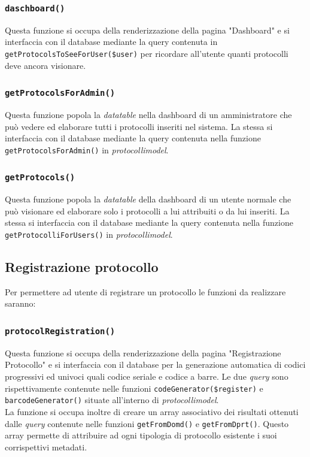     \subsubsection{\texttt{daschboard()}}
    Questa funzione si occupa della renderizzazione della pagina "Dashboard" e si interfaccia con il database mediante la query contenuta in \texttt{getProtocolsToSeeForUser(\$user)} per ricordare all'utente quanti protocolli deve ancora visionare.
    
    \subsubsection{\texttt{getProtocolsForAdmin()}}
    Questa funzione popola la \textit{datatable} nella dashboard di un amministratore che può vedere ed elaborare tutti i protocolli inseriti nel sistema. La stessa si interfaccia con il database mediante la query contenuta nella funzione \texttt{getProtocolsForAdmin()} in \textit{protocollimodel}.
    
    \subsubsection{\texttt{getProtocols()}}
    Questa funzione popola la \textit{datatable} della dashboard di un utente normale che può visionare ed elaborare solo i protocolli a lui attribuiti o da lui inseriti. La stessa si interfaccia con il database mediante la query contenuta nella funzione \texttt{getProtocolliForUsers()} in \textit{protocollimodel}.
    
    \subsection{Registrazione protocollo}
    Per permettere ad utente di registrare un protocollo le funzioni da realizzare saranno:
    
    \subsubsection{\texttt{protocolRegistration()}}
    Questa funzione si occupa della renderizzazione della pagina "Registrazione Protocollo" e si interfaccia con il database per la generazione automatica di codici progressivi ed univoci quali codice seriale e codice a barre. 
    Le due \textit{query} sono rispettivamente contenute nelle funzioni \texttt{codeGenerator(\$register)} e \texttt{barcodeGenerator()} situate all'interno di \textit{protocollimodel}.
    \\
    La funzione si occupa inoltre di creare un array associativo dei risultati ottenuti dalle \textit{query} contenute nelle funzioni \texttt{getFromDomd()} e \texttt{getFromDprt()}.
    Questo array permette di attribuire ad ogni tipologia di protocollo esistente i suoi corrispettivi metadati.
    
